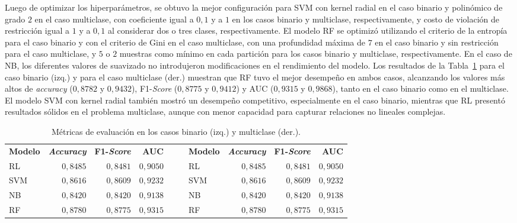 \documentclass{llncs}
\begin{document}
Luego de optimizar los hiperparámetros, se obtuvo la mejor configuración para SVM con kernel radial en el caso binario y polinómico de grado $2$ en el caso multiclase, con coeficiente igual a $0,1$ y a $1$ en los casos binario y multiclase, respectivamente, y costo de violación de restricción igual a $1$ y a $0,1$ al considerar dos o tres clases, respectivamente. El modelo RF se optimizó utilizando el criterio de la entropía para el caso binario y con el criterio de Gini en el caso multiclase, con una profundidad máxima de $7$ en el caso binario y sin restricción para el caso multiclase, y $5$ o $2$ muestras como mínimo en cada partición para los casos binario y multiclase, respectivamente. En el caso de NB, los diferentes valores de suavizado no introdujeron modificaciones en el rendimiento del modelo.
Los resultados de la Tabla~\ref{tab:métricas} para el caso binario (izq.) y para el caso multiclase (der.) muestran que RF tuvo el mejor desempeño en ambos casos, alcanzando los valores más altos de \emph{accuracy} ($0,8782$ y $0,9432$), F1-\emph{Score} ($0,8775$ y $0,9412$) y AUC ($0,9315$ y $0,9868$), tanto en el caso binario como en el multiclase. El modelo SVM con kernel radial también mostró un desempeño competitivo, especialmente en el caso binario, mientras que RL presentó resultados sólidos en el problema multiclase, aunque con menor capacidad para capturar relaciones no lineales complejas. 

\begin{table}
\centering
\caption{Métricas de evaluación en los casos binario (izq.) y multiclase (der.). }\label{tab:métricas}
\begin{tabular}{|l|r|r|r|cc|l|r|r|r|}
\cline{1-4}  \cline{7-10}
\textbf{Modelo}	& \textbf{\emph{Accuracy}} &	\textbf{F1-\emph{Score}} & \textbf{AUC} & & & \textbf{Modelo}	& \textbf{\emph{Accuracy}} &	\textbf{F1-\emph{Score}} & \textbf{AUC} \\ 
\cline{1-4}  \cline{7-10}
RL &	$0,8485$ &	$0,8481$ & $0,9050$ & & & RL &	$0,8485$	& $0,8481$	& $0,9050$ \\
SVM & 	$0,8616$ &	$0,8609$ &	$0,9232$ & & & SVM	& $0,8616$ &	$0,8609$ &	$0,9232$ \\
NB	& $0,8420$	& $0,8420$ &	$0,9138$ & & & NB	& $0,8420$	& $0,8420$	& $0,9138$ \\
RF	& $0,8780$	& $0,8775$ &	$0,9315$ & & & RF	& $0,8780$	& $0,8775$	& $0,9315$
\\
\cline{1-4}  \cline{7-10}
\end{tabular}
\end{table}
\end{document}
